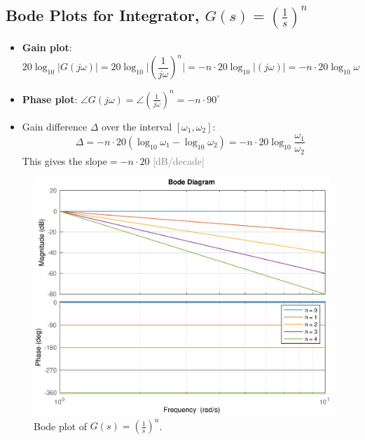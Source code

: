 \documentclass[12pt,a4paper]{article}
\begin{document}
\subsection{Bode Plots for Integrator, $G(s) = (\frac{1}{s})^{n}$}
\begin{itemize}
\item \textbf{Gain plot}: \[20\log_{10}\lvert G(j\omega) \rvert  = 20\log_{10}\lvert (\frac{1}{j\omega})^{n} \rvert = -n\cdot 20\log_{10}\lvert (j\omega) \rvert=\boxed{-n\cdot20\log_{10}\omega}\]
\item \textbf{Phase plot}: $\angle G(j\omega) = \angle (\frac{1}{j\omega})^{n} = \boxed{-n\cdot 90^{\circ}}$
\item Gain difference $\Delta$ over the interval $[\omega_{1}, \omega_{2}] $: \[ \Delta = -n\cdot20(\log_{10}\omega_{1}-\log_{10}\omega_{2})=\boxed{-n\cdot20 \log_{10}\frac{\omega_{1}}{\omega_{2}}}\]
This gives the slope$=-n\cdot 20$ \textcolor{gray}{[dB/decade]}
\end{itemize}
\vspace{-.9cm}
\begin{figure}[H] \centering 
\includegraphics[width=.7\textwidth]{images/bode_5.eps}
\caption{Bode plot of  $G(s) = (\frac{1}{s})^{n}$.}
\end{figure}
\end{document}
